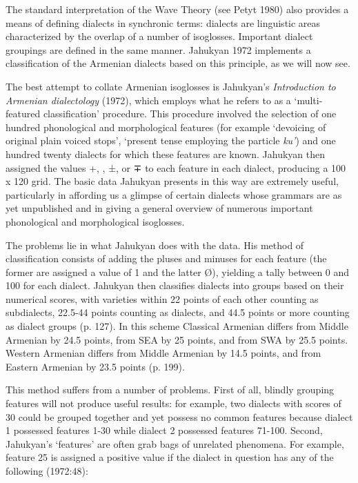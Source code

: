 The standard interpretation of the Wave Theory (see Petyt 1980) also provides a means of defining dialects in synchronic terms: dialects are linguistic areas characterized by the overlap of a number of isoglosses. Important dialect groupings are defined in the same manner. Jahukyan 1972 implements a classification of the Armenian dialects based on this principle, as we will now see.


The best attempt to collate Armenian isoglosses is Jahukyan’s \textit{Introduction to Armenian dialectology} (1972), which employs what he refers to as a ‘multi-featured classification’ procedure. This procedure involved the selection of one hundred phonological and morphological features (for example ‘devoicing of original plain voiced stops’, ‘present tense employing the particle \textit{ku’}) and one hundred twenty dialects for which these features are known. Jahukyan then assigned the values +,  , ±, or ∓ to each feature in each dialect, producing a 100 x 120 grid. The basic data Jahukyan presents in this way are extremely useful, particularly in affording us a glimpse of certain dialects whose grammars are as yet unpublished and in giving a general overview of numerous important phonological and morphological isoglosses. 

The problems lie in what Jahukyan does with the data. His method of classification consists of adding the pluses and minuses for each feature (the former are assigned a value of 1 and the latter Ø), yielding a tally between 0 and 100 for each dialect. Jahukyan then classifies dialects into groups based on their numerical scores, with varieties within 22 points of each other counting as subdialects, 22.5-44 points counting as dialects, and 44.5 points or more counting as dialect groups (p. 127). In this scheme Classical Armenian differs from Middle Armenian by 24.5 points, from SEA by 25 points, and from SWA by 25.5 points. Western Armenian differs from Middle Armenian by 14.5 points, and from Eastern Armenian by 23.5 points (p. 199).

This method suffers from a number of problems. First of all, blindly grouping features will not produce useful results: for example, two dialects with scores of 30 could be grouped together and yet possess no common features because dialect 1 possessed features 1-30 while dialect 2 possessed features 71-100. Second, Jahukyan’s ‘features’ are often grab bags of unrelated phenomena. For example, feature 25 is assigned a positive value if the dialect in question has any of the following (1972:48):

